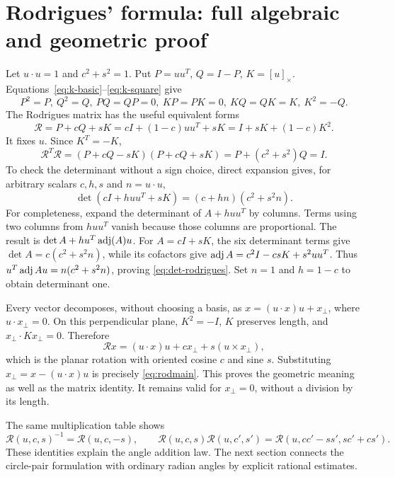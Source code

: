 \documentclass[11pt]{article}
\theoremstyle{definition}\newtheorem{definition}[theorem]{Definition}
\newcommand{\crossmat}[1]{[#1]_{\times}}
\begin{document}
\section{Rodrigues' formula: full algebraic and geometric proof}
\label{sec:rodrigues}
Let $u\cdot u=1$ and $c^2+s^2=1$. Put $P=uu^T$, $Q=I-P$,
$K=\crossmat u$. Equations~\eqref{eq:k-basic}--\eqref{eq:k-square} give
\[
 P^2=P,\ Q^2=Q,\ PQ=QP=0,\ KP=PK=0,\ KQ=QK=K,\ K^2=-Q.
\]
The Rodrigues matrix has the useful equivalent forms
\begin{equation}\label{eq:rodrigues-forms}
 \mathcal R=P+cQ+sK
 =cI+(1-c)uu^T+sK
 =I+sK+(1-c)K^2.
\end{equation}
It fixes $u$. Since $K^T=-K$,
\[
 \mathcal R^T\mathcal R
 =(P+cQ-sK)(P+cQ+sK)
 =P+(c^2+s^2)Q=I.
\]
To check the determinant without a sign choice, direct expansion gives,
for arbitrary scalars $c,h,s$ and $n=u\cdot u$,
\begin{equation}\label{eq:det-rodrigues}
 \det(cI+h uu^T+sK)=(c+hn)(c^2+s^2n).
\end{equation}
For completeness, expand the determinant of $A+h uu^T$ by columns.
Terms using two columns from $h uu^T$ vanish because those columns are
proportional. The result is $\det A+h u^T\operatorname{adj}(A)u$. For $A=cI+sK$,
the six determinant terms give $\det A=c(c^2+s^2n)$, while its cofactors
give
$\operatorname{adj} A=c^2I-csK+s^2uu^T$. Thus
$u^T\operatorname{adj} A u=n(c^2+s^2n)$, proving \eqref{eq:det-rodrigues}.
Set $n=1$ and $h=1-c$ to obtain determinant one.

Every vector decomposes, without choosing a basis, as
$x=(u\cdot x)u+x_\perp$, where $u\cdot x_\perp=0$.
On this perpendicular plane, $K^2=-I$, $K$ preserves length, and
$x_\perp\cdot Kx_\perp=0$. Therefore
\[
 \mathcal R x=(u\cdot x)u+cx_\perp+s(u\times x_\perp),
\]
which is the planar rotation with oriented cosine $c$ and sine $s$.
Substituting $x_\perp=x-(u\cdot x)u$ is precisely
\eqref{eq:rodmain}. This proves the geometric meaning as well as the
matrix identity. It remains valid for $x_\perp=0$, without a division
by its length.

The same multiplication table shows
\[
 \mathcal R(u,c,s)^{-1}=\mathcal R(u,c,-s),\qquad
 \mathcal R(u,c,s)\mathcal R(u,c',s')
 =\mathcal R(u,cc'-ss',sc'+cs').
\]
These identities explain the angle addition law. The next section
connects the circle-pair formulation with ordinary radian angles by
explicit rational estimates.


\end{document}
